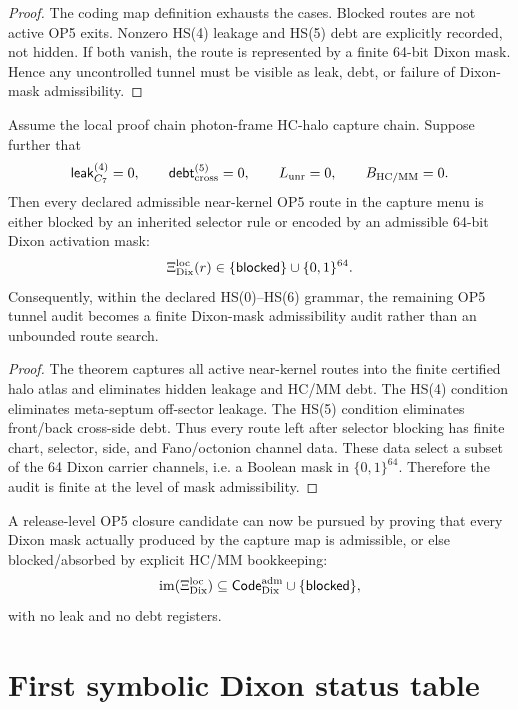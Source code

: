 \begin{proof}
The coding map definition exhausts the cases. Blocked routes are not active OP5 exits. Nonzero HS(4) leakage and HS(5) debt are explicitly recorded, not hidden. If both vanish, the route is represented by a finite 64-bit Dixon mask. Hence any uncontrolled tunnel must be visible as leak, debt, or failure of Dixon-mask admissibility.
\end{proof}

\begin{theorem}
Assume the local proof chain photon-frame HC-halo capture chain. Suppose further that
\[
\mathsf{leak}_{C_7}^{(4)}=0,
\qquad
\mathsf{debt}_{\mathrm{cross}}^{(5)}=0,
\qquad
L_{\mathrm{unr}}=0,
\qquad
B_{\mathrm{HC}/\mathrm{MM}}=0.
\]
Then every declared admissible near-kernel OP5 route in the capture menu is either blocked by an inherited selector rule or encoded by an admissible 64-bit Dixon activation mask:
\[
\Xi_{\mathrm{Dix}}^{\mathrm{loc}}(r)
\in
\{\mathsf{blocked}\}\cup\{0,1\}^{64}.
\]
Consequently, within the declared HS(0)--HS(6) grammar, the remaining OP5 tunnel audit becomes a finite Dixon-mask admissibility audit rather than an unbounded route search.
\end{theorem}

\begin{proof}
The theorem captures all active near-kernel routes into the finite certified halo atlas and eliminates hidden leakage and HC/MM debt. The HS(4) condition eliminates meta-septum off-sector leakage. The HS(5) condition eliminates front/back cross-side debt. Thus every route left after selector blocking has finite chart, selector, side, and Fano/octonion channel data. These data select a subset of the 64 Dixon carrier channels, i.e. a Boolean mask in \(\{0,1\}^{64}\). Therefore the audit is finite at the level of mask admissibility.
\end{proof}

\begin{corollary}
A release-level OP5 closure candidate can now be pursued by proving that every Dixon mask actually produced by the capture map is admissible, or else blocked/absorbed by explicit HC/MM bookkeeping:
\[
\operatorname{im}(\Xi_{\mathrm{Dix}}^{\mathrm{loc}})
\subseteq
\mathsf{Code}_{\mathrm{Dix}}^{\mathrm{adm}}
\cup\{\mathsf{blocked}\},
\]
with no leak and no debt registers.
\end{corollary}

\section{First symbolic Dixon status table}

